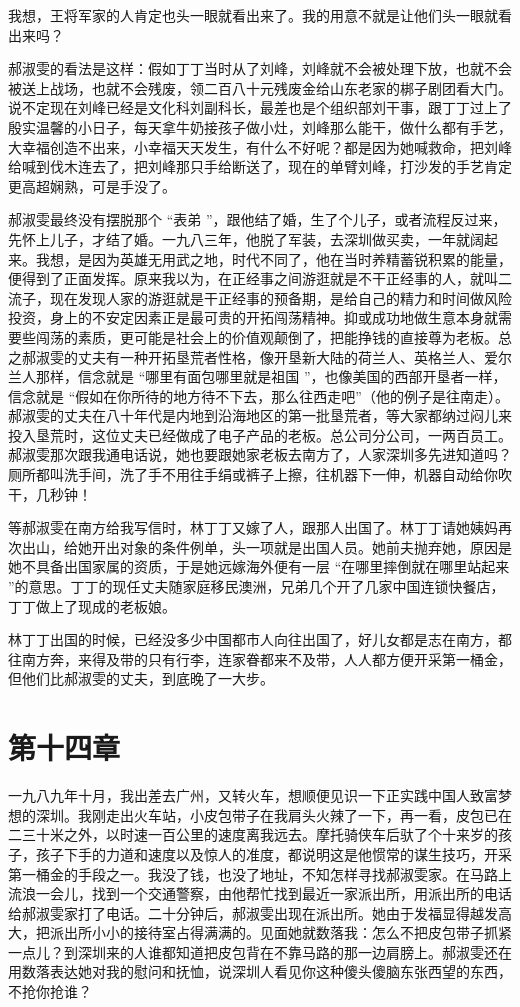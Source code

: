 \documentclass[12pt,twoside,openany]{book}
\begin{document}
我想，王将军家的人肯定也头一眼就看出来了。我的用意不就是让他们头一眼就看出来吗？

郝淑雯的看法是这样：假如丁丁当时从了刘峰，刘峰就不会被处理下放，也就不会被送上战场，也就不会残废，领二百八十元残废金给山东老家的梆子剧团看大门。说不定现在刘峰已经是文化科刘副科长，最差也是个组织部刘干事，跟丁丁过上了殷实温馨的小日子，每天拿牛奶接孩子做小灶，刘峰那么能干，做什么都有手艺，大幸福创造不出来，小幸福天天发生，有什么不好呢？都是因为她喊救命，把刘峰给喊到伐木连去了，把刘峰那只手给断送了，现在的单臂刘峰，打沙发的手艺肯定更高超娴熟，可是手没了。

郝淑雯最终没有摆脱那个 “表弟 ”，跟他结了婚，生了个儿子，或者流程反过来，先怀上儿子，才结了婚。一九八三年，他脱了军装，去深圳做买卖，一年就阔起来。我想，是因为英雄无用武之地，时代不同了，他在当时养精蓄锐积累的能量，便得到了正面发挥。原来我以为，在正经事之间游逛就是不干正经事的人，就叫二流子，现在发现人家的游逛就是干正经事的预备期，是给自己的精力和时间做风险投资，身上的不安定因素正是最可贵的开拓闯荡精神。抑或成功地做生意本身就需要些闯荡的素质，更可能是社会上的价值观颠倒了，把能挣钱的直接尊为老板。总之郝淑雯的丈夫有一种开拓垦荒者性格，像开垦新大陆的荷兰人、英格兰人、爱尔兰人那样，信念就是 “哪里有面包哪里就是祖国 ”，也像美国的西部开垦者一样，信念就是 “假如在你所待的地方待不下去，那么往西走吧”（他的例子是往南走）。郝淑雯的丈夫在八十年代是内地到沿海地区的第一批垦荒者，等大家都纳过闷儿来投入垦荒时，这位丈夫已经做成了电子产品的老板。总公司分公司，一两百员工。郝淑雯那次跟我通电话说，她也要跟她家老板去南方了，人家深圳多先进知道吗？厕所都叫洗手间，洗了手不用往手绢或裤子上擦，往机器下一伸，机器自动给你吹干，几秒钟！

等郝淑雯在南方给我写信时，林丁丁又嫁了人，跟那人出国了。林丁丁请她姨妈再次出山，给她开出对象的条件例单，头一项就是出国人员。她前夫抛弃她，原因是她不具备出国家属的资质，于是她远嫁海外便有一层 “在哪里摔倒就在哪里站起来 ”的意思。丁丁的现任丈夫随家庭移民澳洲，兄弟几个开了几家中国连锁快餐店，丁丁做上了现成的老板娘。

林丁丁出国的时候，已经没多少中国都市人向往出国了，好儿女都是志在南方，都往南方奔，来得及带的只有行李，连家眷都来不及带，人人都方便开采第一桶金，但他们比郝淑雯的丈夫，到底晚了一大步。

\chapter{第十四章}

一九八九年十月，我出差去广州，又转火车，想顺便见识一下正实践中国人致富梦想的深圳。我刚走出火车站，小皮包带子在我肩头火辣了一下，再一看，皮包已在二三十米之外，以时速一百公里的速度离我远去。摩托骑侠车后驮了个十来岁的孩子，孩子下手的力道和速度以及惊人的准度，都说明这是他惯常的谋生技巧，开采第一桶金的手段之一。我没了钱，也没了地址，不知怎样寻找郝淑雯家。在马路上流浪一会儿，找到一个交通警察，由他帮忙找到最近一家派出所，用派出所的电话给郝淑雯家打了电话。二十分钟后，郝淑雯出现在派出所。她由于发福显得越发高大，把派出所小小的接待室占得满满的。见面她就数落我：怎么不把皮包带子抓紧一点儿？到深圳来的人谁都知道把皮包背在不靠马路的那一边肩膀上。郝淑雯还在用数落表达她对我的慰问和抚恤，说深圳人看见你这种傻头傻脑东张西望的东西，不抢你抢谁？
\end{document}
